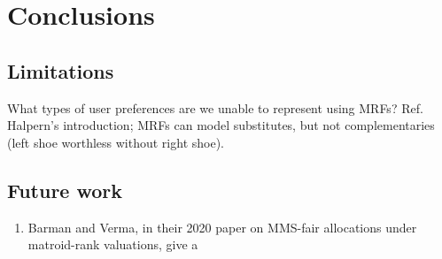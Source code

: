 \chapter{Conclusions}
\label{chap:conclusions}
\section{Limitations}
What types of user preferences are we unable to represent using MRFs? Ref. Halpern's introduction; MRFs can model substitutes, but not complementaries (left shoe worthless without right shoe).

\skelpar
\section{Future work}
\begin{enumerate}
  \item Barman and Verma, in their 2020 paper on MMS-fair allocations under matroid-rank valuations, give a
\end{enumerate}
\skelpar